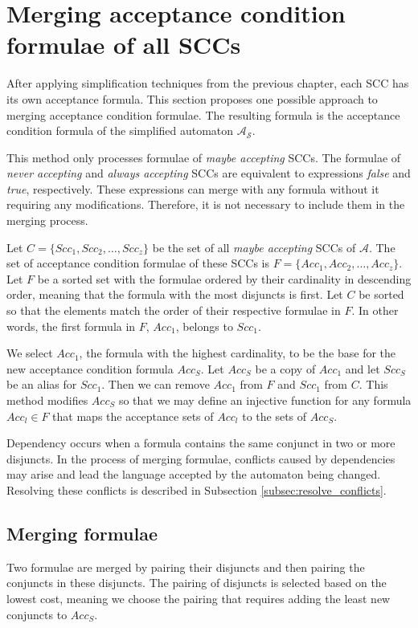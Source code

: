 \documentclass[
  digital, %
  twoside, %
  table,   %
  lof,     %
  lot,     %
]{fithesis3}
\begin{document}
\section{Merging acceptance condition formulae of all SCCs}
After applying simplification techniques from the previous chapter, each SCC has its own acceptance formula. This section proposes one possible approach to merging acceptance condition formulae. The resulting formula is the acceptance condition formula of the simplified automaton $\mathcal{A_S}$.

This method only processes formulae of \emph{maybe accepting} SCCs. The formulae of \emph{never accepting} and \emph{always accepting} SCCs are equivalent to expressions \emph{false} and \emph{true}, respectively. These expressions can merge with any formula without it requiring any modifications. Therefore, it is not necessary to include them in the merging process. 

Let $C = \{Scc_1, Scc_2, \dots, Scc_z\}$ be the set of all \emph{maybe accepting} SCCs of $\mathcal{A}$. The set of acceptance condition formulae of these SCCs is $F = \{Acc_1, Acc_2, \dots, Acc_z\}$. Let $F$ be a sorted set with the formulae ordered by their cardinality in descending order, meaning that the formula with the most disjuncts is first. Let $C$ be sorted so that the elements match the order of their respective formulae in $F$. In other words, the first formula in $F$, $Acc_1$, belongs to $Scc_1$.

We select $Acc_1$, the formula with the highest cardinality, to be the base for the new acceptance condition formula $Acc_S$. Let $Acc_S$ be a copy of $Acc_1$ and let $Scc_S$ be an alias for $Scc_1$. Then we can remove $Acc_1$ from $F$ and $Scc_1$ from $C$. This method modifies $Acc_S$ so that we may define an injective function for any formula $Acc_l \in F$ that maps the acceptance sets of $Acc_l$ to the sets of $Acc_S$.

Dependency occurs when a formula contains the same conjunct in two or more disjuncts. In the process of merging formulae, conflicts caused by dependencies may arise and lead the language accepted by the automaton being changed. Resolving these conflicts is described in Subsection \ref{subsec:resolve_conflicts}. 

\subsection{Merging formulae}
Two formulae are merged by pairing their disjuncts and then pairing the conjuncts in these disjuncts. The pairing of disjuncts is selected based on the lowest cost, meaning we choose the pairing that requires adding the least new conjuncts to $Acc_S$. 
\end{document}
